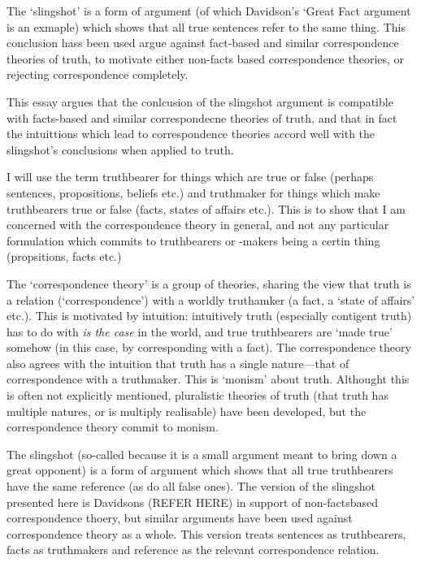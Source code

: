 The `slingshot' is a form of argument (of which Davidson's `Great Fact argument is an exmaple) which shows that all true sentences refer to the same thing.
This conclusion hass been used argue against fact-based and similar correspondence theories of truth, to motivate either non-facts based correspondence theories, or rejecting correspondence completely.

This essay argues that the conlcusion of the slingshot argument is compatible with facts-based and similar correspondecne theories of truth, and that in fact the intuittions which lead to correspondence theories accord well with the slingshot's conclusions when applied to truth.

I will use the term truthbearer for things which are true or false (perhaps sentences, propositions, beliefs etc.) and truthmaker for things which make truthbearers true or false (facts, states of affairs etc.).
This is to show that I am concerned with the correspondence theory in general, and not any particular formulation which commits to truthbearers or -makers being a certin thing (propsitions, facts etc.)

The `correspondence theory' is a group of theories, sharing the view that truth is a relation (`correspondence') with a worldly truthamker (a fact, a `state of affairs' etc.).
This is motivated by intuition: intuitively truth  (especially contigent truth) has to do with \emph{is the case} in the world, and true truthbearers are `made true' somehow (in this case, by corresponding with a fact).
The correspondence theory also agrees with the intuition that truth has a single nature---that of correspondence with a truthmaker.
This is `monism' about truth.
Althought this is often not explicitly mentioned, pluralistic theories of truth (that truth has multiple natures, or is multiply realisable) have been developed, but the correspondence theory commit to monism.

The slingshot (so-called because it is a small argument meant to bring down a great opponent) is a form of argument which shows that all true truthbearers have the same reference (as do all false ones).
The version of the slingshot presented here is Davidsons (REFER HERE) in support of non-factsbased correspondence thoery, but similar arguments have been used against correspondence theory as a whole. 
This version treats sentences as truthbearers, facts as truthmakers and reference as the relevant correspondence relation.

